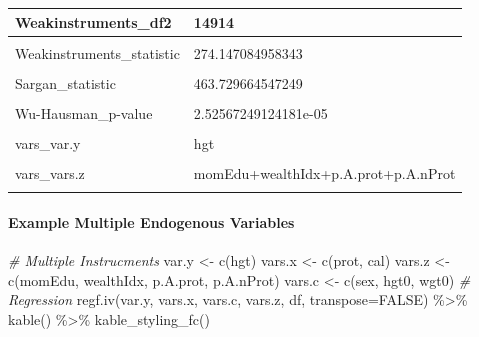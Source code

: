\documentclass[
]{book}
\newenvironment{Shaded}{\begin{snugshade}}{\end{snugshade}}
\newcommand{\AttributeTok}[1]{\textcolor[rgb]{0.77,0.63,0.00}{#1}}
\newcommand{\CommentTok}[1]{\textcolor[rgb]{0.56,0.35,0.01}{\textit{#1}}}
\newcommand{\ConstantTok}[1]{\textcolor[rgb]{0.00,0.00,0.00}{#1}}
\newcommand{\FunctionTok}[1]{\textcolor[rgb]{0.00,0.00,0.00}{#1}}
\newcommand{\NormalTok}[1]{#1}
\newcommand{\OtherTok}[1]{\textcolor[rgb]{0.56,0.35,0.01}{#1}}
\newcommand{\SpecialCharTok}[1]{\textcolor[rgb]{0.00,0.00,0.00}{#1}}
\newcommand{\StringTok}[1]{\textcolor[rgb]{0.31,0.60,0.02}{#1}}
\begin{document}
\begin{table}[!h]
\begin{tabular}{l|l}
\hline
Weakinstruments\_df2 & 14914\\
\hline
\cellcolor{gray!6}{Wu-Hausman\_df2} & \cellcolor{gray!6}{14916}\\
\hline
Weakinstruments\_statistic & 274.147084958343\\
\hline
\cellcolor{gray!6}{Wu-Hausman\_statistic} & \cellcolor{gray!6}{17.7562545747101}\\
\hline
Sargan\_statistic & 463.729664547249\\
\hline
\cellcolor{gray!6}{Weakinstruments\_p-value} & \cellcolor{gray!6}{8.61731956233366e-228}\\
\hline
Wu-Hausman\_p-value & 2.52567249124181e-05\\
\hline
\cellcolor{gray!6}{Sargan\_p-value} & \cellcolor{gray!6}{3.45452874915475e-100}\\
\hline
vars\_var.y & hgt\\
\hline
\cellcolor{gray!6}{vars\_vars.x} & \cellcolor{gray!6}{prot}\\
\hline
vars\_vars.z & momEdu+wealthIdx+p.A.prot+p.A.nProt\\
\hline
\cellcolor{gray!6}{vars\_vars.c} & \cellcolor{gray!6}{sex+hgt0+wgt0}\\
\hline
\end{tabular}
\end{table}

\hypertarget{example-multiple-endogenous-variables}{%
\paragraph{Example Multiple Endogenous Variables}\label{example-multiple-endogenous-variables}}

\begin{Shaded}
\begin{Highlighting}[]
\CommentTok{\# Multiple Instrucments}
\NormalTok{var.y }\OtherTok{\textless{}{-}} \FunctionTok{c}\NormalTok{(}\StringTok{\textquotesingle{}hgt\textquotesingle{}}\NormalTok{)}
\NormalTok{vars.x }\OtherTok{\textless{}{-}} \FunctionTok{c}\NormalTok{(}\StringTok{\textquotesingle{}prot\textquotesingle{}}\NormalTok{, }\StringTok{\textquotesingle{}cal\textquotesingle{}}\NormalTok{)}
\NormalTok{vars.z }\OtherTok{\textless{}{-}} \FunctionTok{c}\NormalTok{(}\StringTok{\textquotesingle{}momEdu\textquotesingle{}}\NormalTok{, }\StringTok{\textquotesingle{}wealthIdx\textquotesingle{}}\NormalTok{, }\StringTok{\textquotesingle{}p.A.prot\textquotesingle{}}\NormalTok{, }\StringTok{\textquotesingle{}p.A.nProt\textquotesingle{}}\NormalTok{)}
\NormalTok{vars.c }\OtherTok{\textless{}{-}} \FunctionTok{c}\NormalTok{(}\StringTok{\textquotesingle{}sex\textquotesingle{}}\NormalTok{, }\StringTok{\textquotesingle{}hgt0\textquotesingle{}}\NormalTok{, }\StringTok{\textquotesingle{}wgt0\textquotesingle{}}\NormalTok{)}
\CommentTok{\# Regression}
\FunctionTok{regf.iv}\NormalTok{(var.y, vars.x, vars.c, vars.z, df, }\AttributeTok{transpose=}\ConstantTok{FALSE}\NormalTok{) }\SpecialCharTok{\%\textgreater{}\%}
  \FunctionTok{kable}\NormalTok{() }\SpecialCharTok{\%\textgreater{}\%}
  \FunctionTok{kable\_styling\_fc}\NormalTok{()}
\end{Highlighting}
\end{Shaded}
\end{document}
